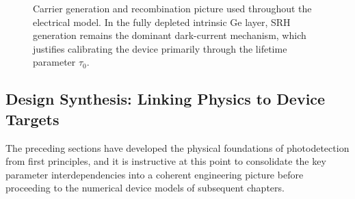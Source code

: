 \begin{figure}[H]
    \centering
    \caption{Carrier generation and recombination picture used throughout the
    electrical model. In the fully depleted intrinsic Ge layer, SRH generation
    remains the dominant dark-current mechanism, which justifies calibrating
    the device primarily through the lifetime parameter $\tau_0$.}
    \label{fig:generation_recombination}
\end{figure}

\subsection[Design Synthesis: Linking Physics to Device Targets]%
           {Design Synthesis: Linking Physics to Device Targets}
\label{subsec:pd_synthesis}

The preceding sections have developed the physical foundations of photodetection
from first principles, and it is instructive at this point to consolidate the
key parameter interdependencies into a coherent engineering picture before
proceeding to the numerical device models of subsequent chapters.

